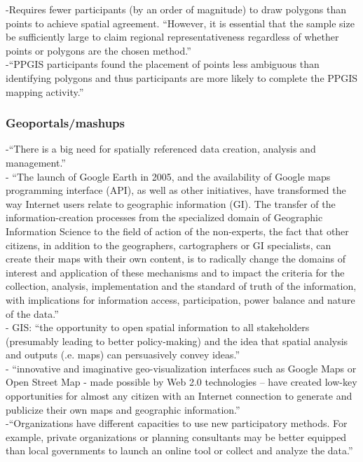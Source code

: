 -{\color{orange}Requires fewer participants (by an order of magnitude) to draw polygons than points to achieve spatial agreement. “However, it is essential that the sample size be sufficiently large to claim regional representativeness regardless of whether points or polygons are the chosen method.” \cite{Brown2012}}\\
-{\color{orange}“PPGIS participants found the placement of points less ambiguous than identifying polygons and thus participants are more likely to complete the PPGIS mapping activity.” \cite{Brown2012}}\\

\subsubsection{Geoportals/mashups}
-{\color{orange}“There is a big need for spatially referenced data creation, analysis and management.”}\cite{Bhattacharya2018}\\
-{\color{orange} “The launch of Google Earth in 2005, and the availability of Google maps programming interface (API), as well as other initiatives, have transformed the way Internet users relate to geographic information (GI). The transfer of the information-creation processes from the specialized domain of Geographic Information Science to the field of action of the non-experts, the fact that other citizens, in addition to the geographers, cartographers or GI specialists, can create their maps with their own content, is to radically change the domains of interest and application of these mechanisms and to impact the criteria for the collection, analysis, implementation and the standard of truth of the information, with implications for information access, participation, power balance and nature of the data.”} \cite{Painho2013}\\
-{\color{orange} GIS: “the opportunity to  open spatial information to all stakeholders (presumably leading to better policy-making) and the idea that spatial analysis and outputs (.e. maps) can persuasively convey ideas.”}\cite{Kleinhans2015}\\
-{\color{orange} “innovative and imaginative geo-visualization interfaces such as Google Maps or Open Street Map - made possible by Web 2.0 technologies -- have created low-key opportunities for almost any citizen with an Internet connection to generate and publicize their own maps and geographic information.”} \cite{Kleinhans2015}\\
-{\color{orange}“Organizations have different capacities to use new participatory methods. For example, private organizations or planning consultants may be better equipped than local governments to launch an online tool or collect and analyze the data.”}\cite{Afzalan2017}\\
